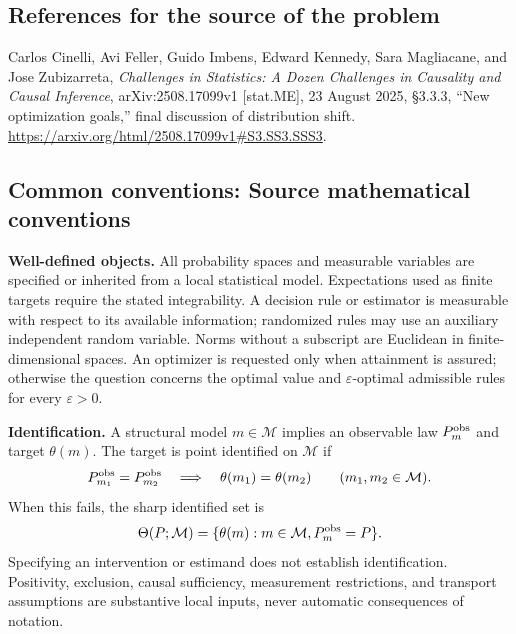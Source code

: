 \documentclass[11pt,a4paper]{article}
\begin{document}
\subsection*{References for the source of the problem}
Carlos Cinelli, Avi Feller, Guido Imbens, Edward Kennedy, Sara Magliacane, and Jose Zubizarreta, \emph{Challenges in Statistics: A Dozen Challenges in Causality and Causal Inference}, arXiv:2508.17099v1 [stat.ME], 23 August 2025, \S3.3.3, ``New optimization goals,'' final discussion of distribution shift. \url{https://arxiv.org/html/2508.17099v1#S3.SS3.SSS3}.

\subsection*{Common conventions: Source mathematical conventions}

\textbf{Well-defined objects.}
All probability spaces and measurable variables are specified or inherited
from a local statistical model. Expectations used as finite targets require
the stated integrability. A decision rule or estimator is measurable with
respect to its available information; randomized rules may use an auxiliary
independent random variable. Norms without a subscript are Euclidean in
finite-dimensional spaces. An optimizer is requested only when attainment
is assured; otherwise the question concerns the optimal value and
$\varepsilon$-optimal admissible rules for every $\varepsilon>0$.

\textbf{Identification.}
A structural model $m\in\mathcal M$ implies an observable law
$P_m^{\rm obs}$ and target $\theta(m)$. The target is point identified on
$\mathcal M$ if
\[
 P_{m_1}^{\rm obs}=P_{m_2}^{\rm obs}
 \quad\Longrightarrow\quad\theta(m_1)=\theta(m_2)
 \qquad(m_1,m_2\in\mathcal M).
\]
When this fails, the sharp identified set is
\[
 \Theta(P;\mathcal M)=\{\theta(m):m\in\mathcal M,
                                  P_m^{\rm obs}=P\}.
\]
Specifying an intervention or estimand does not establish identification.
Positivity, exclusion, causal sufficiency, measurement restrictions, and
transport assumptions are substantive local inputs, never automatic
consequences of notation.
\end{document}
